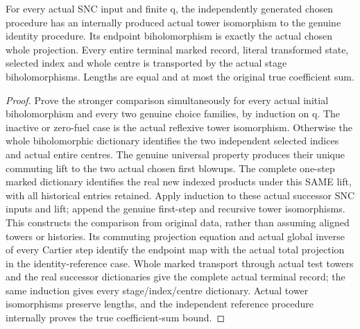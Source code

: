 \begin{theorem}
\label{hir:nc-ordered-choice-actual-reference-comparison}
\leanok
For every actual SNC input and finite q, the independently generated chosen
procedure has an internally produced actual tower isomorphism to the genuine
identity procedure. Its endpoint biholomorphism is exactly the actual chosen
whole projection. Every entire terminal marked record, literal transformed
state, selected index and whole centre is transported by the actual stage
biholomorphisms. Lengths are equal and at most the original true coefficient sum.
\end{theorem}
\begin{proof}
Prove the stronger comparison simultaneously for every actual initial
biholomorphism and every two genuine choice families, by induction on q.
The inactive or zero-fuel case is the actual reflexive tower isomorphism.
Otherwise the whole biholomorphic dictionary identifies the two independent
selected indices and actual entire centres. The genuine universal property
produces their unique commuting lift to the two actual chosen first blowups.
The complete one-step marked dictionary identifies the real new indexed
products under this SAME lift, with all historical entries retained. Apply
induction to these actual successor SNC inputs and lift; append the genuine
first-step and recursive tower isomorphisms. This constructs the comparison
from original data, rather than assuming aligned towers or histories. Its
commuting projection equation and actual global inverse of every Cartier
step identify the endpoint map with the actual total projection in the
identity-reference case. Whole marked transport through actual test towers
and the real successor dictionaries give the complete actual terminal
record; the same induction gives every stage/index/centre dictionary. Actual
tower isomorphisms preserve lengths, and the independent reference procedure
internally proves the true coefficient-sum bound.
\end{proof}

